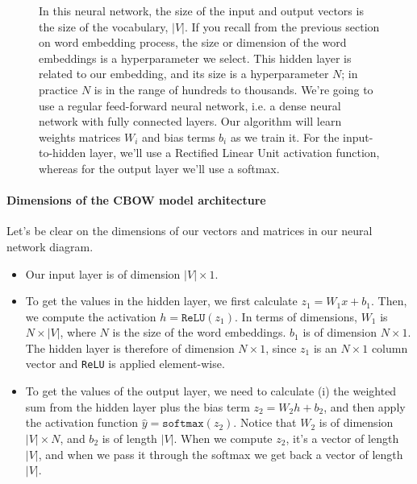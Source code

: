 \documentclass[12pt]{article}
\begin{document}
\begin{figure}[h]
\begin{center}
\caption{\small In this neural network, the size of the input and output vectors is the size of the vocabulary, $|V|$. If you recall from the previous section on word embedding process, the size or dimension of the word embeddings is a hyperparameter we select. This hidden layer is related to our embedding, and its size is a hyperparameter $N$; in practice $N$ is in the range of hundreds to thousands. We're going to use a regular feed-forward neural network, i.e. a dense neural network with fully connected layers. Our algorithm will learn weights matrices $W_i$ and bias terms $b_i$ as we train it. For the input-to-hidden layer, we'll use a Rectified Linear Unit activation function, whereas for the output layer we'll use a softmax.}
  \end{center}
\end{figure}

\paragraph{Dimensions of the CBOW model architecture}
Let's be clear on the dimensions of our vectors and matrices in our neural network diagram.

\begin{itemize}
\item Our input layer is of dimension $|V| \times 1$.
\item To get the values in the hidden layer, we first calculate $z_1 = W_1 x + b_1$. Then, we compute the activation $h = \texttt{ReLU}(z_1)$. In terms of dimensions, $W_1$ is $N \times |V|$, where $N$ is the size of the word embeddings. $b_1$ is of dimension $N \times 1$. The hidden layer is therefore of dimension $N \times 1$, since $z_1$ is an $N \times 1$ column vector and \texttt{ReLU} is applied element-wise.
\item To get the values of the output layer, we need to calculate (i) the weighted sum from the hidden layer plus the bias term $z_2 = W_2 h + b_2$, and then apply the activation function $\hat y = \texttt{softmax}(z_2)$. Notice that $W_2$ is of dimension $|V| \times N$, and $b_2$ is of length $|V|$. When we compute $z_2$, it's a vector of length $|V|$, and when we pass it through the softmax we get back a vector of length $|V|$.
\end{itemize}
\end{document}
